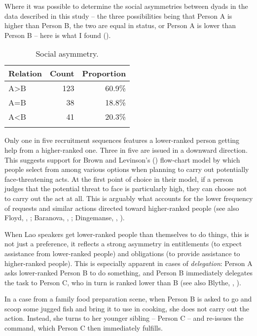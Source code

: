 \documentclass[output=paper]{langsci/langscibook}
\begin{document}
Where it was possible to determine the social asymmetries between dyads in the data described in this study -- the three possibilities being that Person A is higher than Person B, the two are equal in status, or Person A is lower than Person B -- here is what I found ().

\begin{table}
\begin{tabularx}{0.5\textwidth}{Xrr}
\lsptoprule
Relation & Count & Proportion\\
\midrule
A>B & 123 & 60.9\%\\
A=B & 38 & 18.8\%\\
A<B & 41 & 20.3\%\\
\lspbottomrule
\end{tabularx}
\caption{Social asymmetry.}
\label{tab:enfield:9}
\end{table}

Only one in five recruitment sequences features a lower-ranked person getting help from a higher-ranked one. Three in five are issued in a downward direction. This suggests support for Brown and Levinson's (\citeyear[69--74]{BrownLevinson1987}) flow-chart model by which people select from among various options when planning to carry out potentially face-threatening acts. At the first point of choice in their model, if a person judges that the potential threat to face is particularly high, they can choose not to carry out the act at all. This is arguably what accounts for the lower frequency of requests and similar actions directed toward higher-ranked people (see also Floyd, , ; Baranova, , ; Dingemanse, , ).

When Lao speakers get lower-ranked people than themselves to do things, this is not just a preference, it reflects a strong asymmetry in entitlements (to expect assistance from lower-ranked people) and obligations (to provide assistance to higher-ranked people). This is especially apparent in cases of \textit{delegation}: Person A asks lower-ranked Person B to do something, and Person B immediately delegates the task to Person C, who in turn is ranked lower than B (see also Blythe, , ).

In a case from a family food preparation scene, when Person B is asked to go and scoop some jugged fish and bring it to use in cooking, she does not carry out the action. Instead, she turns to her younger sibling -- Person C -- and re-issues the command, which Person C then immediately fulfills.
\end{document}
